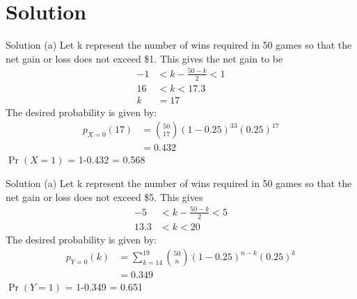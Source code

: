 \documentclass{beamer}
\providecommand{\pr}[1]{\ensuremath{\Pr\left(#1\right)}}
\providecommand{\pr}[1]{\ensuremath{\Pr\left(#1\right)}}
\begin{document}
\section{Solution}
\begin{frame}{Solution}
(a) Let k represent the number of wins required in 50 games so that
the net gain or loss does not exceed \$1. This gives the net gain to be 
\begin{align}
    -1 &< k - \frac{50-k}{2} <  1\\
     16 &< k < 17.3 \\
      k &= 17
      \end{align}
      The desired probability is given by:
	\begin{align}
		p_{X=0}(17)&= \binom{50}{17} (1-0.25)^{33} (0.25)^{17} \\
		&=0.432
\end{align}
\therefore \pr{X=1} = 1-0.432 = 0.568
\end{frame}

\begin{frame}{Solution}
(a) Let k represent the number of wins required in 50 games so that
the net gain or loss does not exceed \$5. This gives 
\begin{align}
    -5 &< k - \frac{50-k}{2} <  5\\
     13.3 &< k < 20 
      \end{align}
      The desired probability is given by:
	\begin{align}
		p_{Y=0}(k)&=\sum_{k=14}^{19} \binom{50}{n} (1-0.25)^{n-k} (0.25)^{k}\\
		&=0.349
\end{align}
\therefore \pr{Y=1} = 1-0.349 = 0.651
\end{frame}
\end{document}
